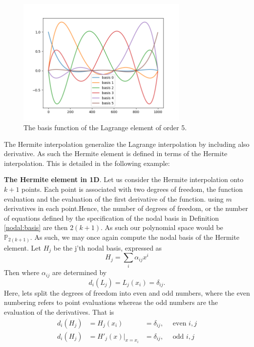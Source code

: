 \begin{figure}
\begin{center}
\includegraphics[width=0.75\textwidth]{chapters/element/plots/Lagrange5.png}
\caption{
The basis function of the Lagrange element of order 5. }
\label{fig:Lagrange5}
\end{center}
\end{figure}


The Hermite interpolation generalize the Lagrange interpolation by including also derivative. As such 
the Hermite element is defined in terms of the Hermite interpolation. This is detailed in the following example: 
\begin{exmp}{\textbf{The Hermite element in 1D}.} 
\label{hermite:element}
Let us consider the Hermite interpolation onto $k+1$ points.  
Each point is associated with two degrees of freedom, the function evaluation and the evaluation of the first 
derivative of the function.  
using $m$ derivatives in each point.Hence,  
the number of degrees of freedom, or the number of equations defined by the specification of the nodal 
basis in Definition \ref{nodal:basis} are then $2(k+1)$. As such our polynomial space would be $\mathbb{P}_{2(k+1)}$.    
As such, we may once again compute the nodal basis of the Hermite element. 
Let $H_j$ be the j'th nodal basis, expressed as  
\[ 
H_j = \sum_i \alpha_{ij} x^i 
\]
Then 
where $\alpha_{ij}$ are determined by 
\[ 
d_i(L_j) = L_j(x_i) = \delta_{ij} . 
\]
Here, lets split the degrees of freedom into even and odd numbers, where the even numbering refers to 
point evaluations whereas the odd numbers are the evaluation of the derivatives. 
That is 
\begin{align*} 
d_i(H_j) &= H_j(x_i)  &=  \delta_{ij}, \quad \mbox{ even } i,j   \\
d_i(H_j) &= H'_j(x) |_{x=x_i} &= \delta_{ij}, \quad \mbox{ odd } i,j  
\end{align*}

\end{exmp}

